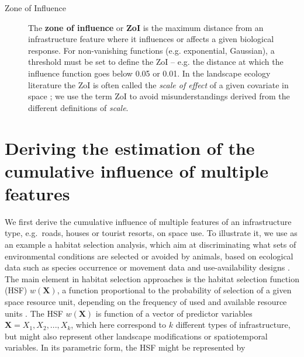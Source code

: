 \documentclass[titlepage]{article}
\begin{document}
\begin{tcolorbox}[width=1.3\textwidth,center,colback=yellow!5,colframe=yellow!75!black,title={Box 1 -- Definitions}]
\begin{description}
    \item[Zone of Influence] The \textbf{zone of influence} or \textbf{ZoI} is the maximum distance from an infrastructure feature where it influences or affects a given biological response. For non-vanishing functions (e.g. exponential, Gaussian), a threshold must be set to define the ZoI -- e.g. the distance at which the influence function goes below 0.05 or 0.01. 
    In the landscape ecology literature the ZoI is often called the \textit{scale of effect} of a given covariate in space \citep[e.g.][]{jackson_are_2015}; we use the term ZoI to avoid misunderstandings derived from the different definitions of \textit{scale}. 
    

\end{description}
\end{tcolorbox}

\section{Deriving the estimation of the cumulative influence of multiple features}

We first derive the cumulative influence of multiple features of an infrastructure type, e.g.\ roads, houses or tourist resorts, on space use. To illustrate it, we use as an example a habitat selection analysis, which aim at discriminating what sets of environmental conditions are selected or avoided by animals, based on ecological data such as species occurrence or movement data and use-availability designs \citep{johnson_resource_2006,fieberg_how_2021}. The main element in habitat selection approaches is the habitat selection function (HSF) $w(\textbf{X})$, a function proportional to the probability of selection of a given space resource unit, depending on the frequency of used and available resource units \citep{thurfjell_applications_2014}. The HSF $w(\textbf{X})$ is function of a vector of predictor variables $\textbf{X} = X_1,X_2, ...,  X_k$, which here correspond to $k$ different types of infrastructure, but might also represent other landscape modifications or spatiotemporal variables. In its parametric form, the HSF might be represented by
\end{document}
